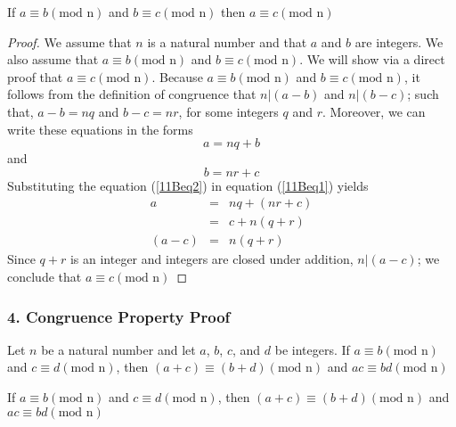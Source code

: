 \begin{definition}
\begin{tcolorbox}
	\begin{theorem}
		If $a \equiv b (\text{mod n})$ and $b \equiv c (\text{mod n})$ then $a \equiv c (\text{mod n})$
	\end{theorem}
\end{tcolorbox}

\begin{proof}

We assume that $n$ is a natural number and that $a$ and $b$ are integers. We also assume that $a \equiv b (\text{mod n})$ and $b \equiv c (\text{mod n})$. We will show via a direct proof that $a \equiv c (\text{mod n})$. Because $a \equiv b (\text{mod n})$ and $b \equiv c (\text{mod n})$, it follows from the definition of congruence that $n|(a-b)$ and $n|(b-c)$; such that, $a-b = nq$ and $b-c = nr$, for some integers $q$ and $r$. Moreover, we can write these equations in the forms 
	\begin{equation}
	\label{11Beq1}	
		a = nq + b
	\end{equation}
and 
	\begin{equation}
	\label{11Beq2}
		b = nr + c
	\end{equation}
Substituting the equation (\ref{11Beq2}) in equation (\ref{11Beq1}) yields
	\begin{eqnarray}
		a & = & nq + (nr + c) \nonumber \\
		& = & c + n(q+r) \nonumber \\
		(a-c)& = & n(q+r) \nonumber
	\end{eqnarray}
Since $q+r$ is an integer and integers are closed under addition, $n | (a-c)$; we conclude that $a \equiv c (\text{mod n})$

\end{proof}
\end{definition}



\subsubsection*{4. Congruence Property Proof} 
Let $n$ be a natural number and let $a$, $b$, $c$, and $d$ be integers. If $a \equiv b (\text{mod n})$ and $c \equiv d (\text{mod n})$, then $(a + c) \equiv (b + d) (\text{mod n})$ and $ac \equiv bd (\text{mod n})$ \\

\begin{tcolorbox}
	\begin{theorem}
		If $a \equiv b (\text{mod n})$ and $c \equiv d (\text{mod n})$, then $(a + c) \equiv (b + d) (\text{mod n})$ and $ac \equiv bd (\text{mod n})$
	\end{theorem}
\end{tcolorbox}


